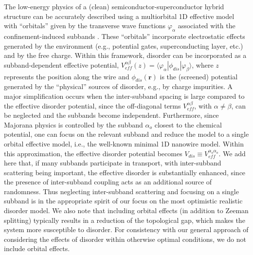 \documentclass[aps,prmaterials,twocolumn,superscriptaddress,longbibliography]{revtex4-2}
\begin{document}
The low-energy physics of a (clean) semiconductor-superconductor hybrid structure can be accurately described using a multiorbital 1D effective model with ``orbitals'' given by the transverse wave functions $\varphi_\alpha$ associated with the confinement-induced subbands \cite{woods2018effective}. These ``orbitals'' incorporate electrostatic effects generated by the environment (e.g.,  potential gates,  superconducting layer, etc.) and by the free charge. Within this framework,  disorder can be incorporated as a subband-dependent effective potential, $V_{eff}^{\alpha\beta}(z) = \langle \varphi_\alpha|\phi_{dis}|\varphi_\beta\rangle$, where $z$ represents the position along the wire and $\phi_{dis}({\bm r})$ is the (screened) potential generated by the ``physical'' sources of disorder, e.g., by charge impurities. A major simplification occurs when the inter-subband spacing is large compared to the effective disorder potential, since the off-diagonal terms $V_{eff}^{\alpha\beta}$, with $\alpha\neq\beta$, can be neglected and the subbands become independent. Furthermore, since Majorana physics is controlled by the subband $\alpha_o$ closest to the chemical potential, one can focus on the relevant subband and reduce the model to a single orbital effective model, i.e., the well-known minimal 1D nanowire model. Within this approximation, the effective disorder potential becomes $V_{dis} \equiv   V_{eff}^{\alpha_o\alpha_o}$.  
We add here that, if many subbands participate in transport, with inter-subband scattering being important, the effective disorder is substantially enhanced, since the presence of inter-subband coupling acts as an additional source of randomness. Thus neglecting inter-subband scattering and focusing on a single subband is in the appropriate spirit of our focus on the most optimistic realistic disorder model. {We also note that including orbital effects \cite{nijholt2016orbital,manolescu2017majorana,nowak2018renormalization,serra2020evidence,lei2021majorana} (in addition to Zeeman splitting) typically results in a reduction of the topological gap\cite{nijholt2016orbital}, which makes the system more susceptible to disorder. For consistency with our general approach of considering the effects of disorder within otherwise optimal conditions, we do not include orbital effects.}
\end{document}
